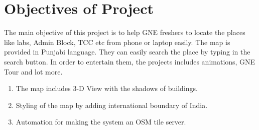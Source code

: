 \section{Objectives of Project }
The main objective of this project is to help GNE freshers to locate the places like labs, Admin Block, TCC etc from phone or laptop easily. The map is provided in Punjabi language. They can easily search the place by typing in the search button. In order to entertain them, the projects includes animations, GNE Tour and lot more. 
\begin{enumerate}
\item The map includes 3-D View with the shadows of buildings.
\item Styling of the map by adding international boundary of India.
\item Automation for making the system an OSM tile server.
\end{enumerate}

